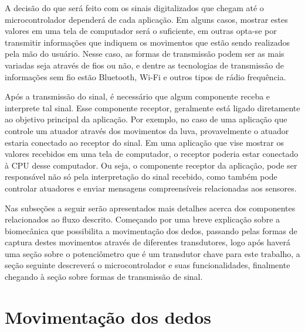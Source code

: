 \documentclass[
	12pt,				%
	openright,			%
	oneside,			%
	a4paper,			%
	english,			%
	brazil				%
	]{abntex2}
\begin{document}
		A decisão do que será feito com os sinais digitalizados que chegam até o microcontrolador dependerá de cada aplicação. Em alguns casos, mostrar estes valores em uma tela de computador será o suficiente, em outras opta-se por transmitir informações que indiquem os movimentos que estão sendo realizados pela mão do usuário. Nesse caso, as formas de transmissão podem ser as mais variadas seja através de fios ou não, e dentre as tecnologias de transmissão de informações sem fio estão Bluetooth, Wi-Fi e outros tipos de rádio frequência.

		Após a transmissão do sinal, é necessário que algum componente receba e interprete tal sinal. Esse componente receptor, geralmente está ligado diretamente ao objetivo principal da aplicação. Por exemplo, no caso de uma aplicação que controle um atuador através dos movimentos da luva, provavelmente o atuador estaria conectado ao receptor do sinal. Em uma aplicação que vise mostrar os valores recebidos em uma tela de computador, o receptor poderia estar conectado à CPU desse computador. Ou seja, o componente receptor da aplicação, pode ser responsável não só pela interpretação do sinal recebido, como também pode controlar atuadores e enviar mensagens compreensíveis relacionadas aos sensores.

		Nas subseções a seguir serão apresentados mais detalhes acerca dos componentes relacionados ao fluxo descrito. Começando por uma breve explicação sobre a biomecânica que possibilita a movimentação dos dedos, passando pelas formas de captura destes movimentos através de diferentes transdutores, logo após haverá uma seção sobre o potenciômetro que é um transdutor chave para este trabalho, a seção seguinte descreverá o microcontrolador e suas funcionalidades, finalmente chegando à seção sobre formas de transmissão de sinal.





		\section{Movimentação dos dedos} \label{movimentacaodosdedos}
\end{document}
